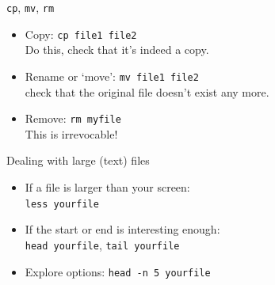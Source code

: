 \documentclass[11pt,headernav]{beamer}
\begin{document}


\begin{numberedframe}{\texttt{cp}, \texttt{mv}, \texttt{rm}}
  \label{sl-lnx:cpmv}
  \begin{itemize}
  \item Copy: \lstinline{cp file1 file2}\\
    Do this, check that it's indeed a copy.
  \item Rename or `move': \lstinline{mv file1 file2}\\
    check that the original file doesn't exist any more.
  \item Remove: \lstinline{rm myfile}\\
    This is irrevocable!
  \end{itemize}
\end{numberedframe}




\begin{numberedframe}{Dealing with large (text) files}
  \label{sl-lnx:headtail}
  \begin{itemize}
  \item If a file is larger than your screen:\\
    \lstinline{less yourfile}
  \item If the start or end is interesting enough:\\
    \lstinline{head yourfile}, \lstinline{tail yourfile}
  \item Explore options: \lstinline{head -n 5 yourfile}
  \end{itemize}
\end{numberedframe}
\end{document}

